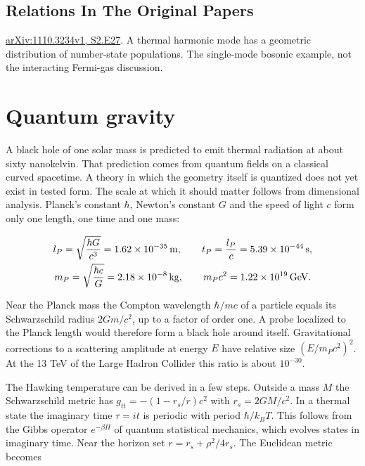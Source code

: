 \documentclass[11pt,oneside]{book}
\newenvironment{centeredalign}{\[\begin{gathered}[c]}{\end{gathered}\]}
\begin{document}
\subsection*{Relations In The Original Papers}

\href{https://arxiv.org/html/1110.3234v1#S2.E27}{arXiv:1110.3234v1, S2.E27}. A thermal harmonic mode has a geometric distribution of number-state populations. The single-mode bosonic example, not the interacting Fermi-gas discussion.



\clearpage

\section{Quantum gravity}

\label{topic:quantum-gravity}

A black hole of one solar mass is predicted to emit thermal radiation at about sixty nanokelvin. That prediction comes from quantum fields on a classical curved spacetime. A theory in which the geometry itself is quantized does not yet exist in tested form. The scale at which it should matter follows from dimensional analysis. Planck's constant \(\hbar\), Newton's constant \(G\) and the speed of light \(c\) form only one length, one time and one mass:

\begin{centeredalign}
l_P=\sqrt{\frac{\hbar G}{c^3}}=1.62\times10^{-35}\,{\rm m},\qquad
t_P=\frac{l_P}{c}=5.39\times10^{-44}\,{\rm s},\\
m_P=\sqrt{\frac{\hbar c}{G}}=2.18\times10^{-8}\,{\rm kg},\qquad
m_Pc^2=1.22\times10^{19}\,{\rm GeV}.
\end{centeredalign}

Near the Planck mass the Compton wavelength \(\hbar/mc\) of a particle equals its Schwarzschild radius \(2Gm/c^2\), up to a factor of order one. A probe localized to the Planck length would therefore form a black hole around itself. Gravitational corrections to a scattering amplitude at energy \(E\) have relative size \((E/m_Pc^2)^2\). At the 13 TeV of the Large Hadron Collider this ratio is about \(10^{-30}\).

The Hawking temperature can be derived in a few steps. Outside a mass \(M\) the Schwarzschild metric has \(g_{tt}=-(1-r_s/r)c^2\) with \(r_s=2GM/c^2\). In a thermal state the imaginary time \(\tau=it\) is periodic with period \(\hbar/k_BT\). This follows from the Gibbs operator \(e^{-\beta H}\) of quantum statistical mechanics, which evolves states in imaginary time. Near the horizon set \(r=r_s+\rho^2/4r_s\). The Euclidean metric becomes
\end{document}
